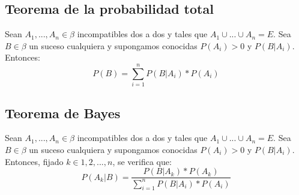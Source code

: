 \subsection{Teorema de la probabilidad total}
Sean $A_{1},...,A_{n} \in \beta$ incompatibles dos a dos y tales que $A_{1} \cup ... \cup A_{n} = E$. Sea $B \in \beta$ un suceso cualquiera y supongamos conocidas $P(A_{i})>0$ y $P(B|A_{i})$. Entonces:
\[P(B) = \sum_{i=1}^{n} P(B|A_{i})*P(A_{i})\]

\subsection{Teorema de Bayes}
Sean $A_{1},...,A_{n} \in \beta$ incompatibles dos a dos y tales que $A_{1} \cup ... \cup A_{n} = E$. Sea $B \in \beta$ un suceso cualquiera y supongamos conocidas $P(A_{i})>0$ y $P(B|A_{i})$. Entonces, fijado $k \in {1,2,...,n}$, se verifica que:
\[P(A_{k}|B) = \frac{P(B|A_{k})*P(A_{k})}{ \sum_{i=1}^{n} P(B|A_{i})*P(A_{i})}\]